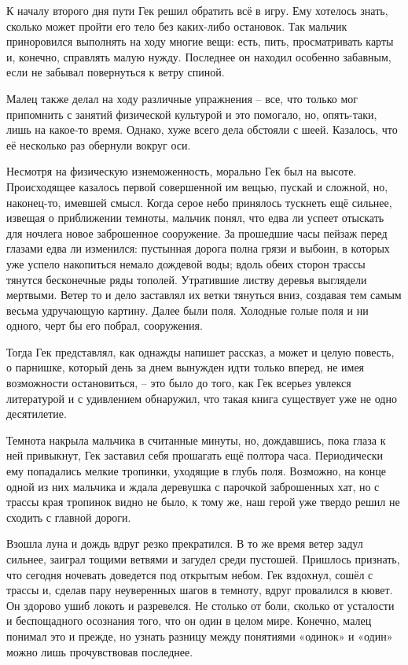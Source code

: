 \documentclass[
  a5paperpaper,
  DIV=11,
  numbers=noendperiod]{scrreprt}
\begin{document}
К началу второго дня пути Гек решил обратить всё в игру. Ему хотелось
знать, сколько может пройти его тело без каких-либо остановок. Так
мальчик приноровился выполнять на ходу многие вещи: есть, пить,
просматривать карты и, конечно, справлять малую нужду. Последнее он
находил особенно забавным, если не забывал повернуться к ветру спиной.

Малец также делал на ходу различные упражнения -- все, что только мог
припомнить с занятий физической культурой и это помогало, но,
опять-таки, лишь на какое-то время. Однако, хуже всего дела обстояли с
шеей. Казалось, что её несколько раз обернули вокруг оси.

Несмотря на физическую изнеможенность, морально Гек был на высоте.
Происходящее казалось первой совершенной им вещью, пускай и сложной, но,
наконец-то, имевшей смысл. Когда серое небо принялось тускнеть ещё
сильнее, извещая о приближении темноты, мальчик понял, что едва ли
успеет отыскать для ночлега новое заброшенное сооружение. За прошедшие
часы пейзаж перед глазами едва ли изменился: пустынная дорога полна
грязи и выбоин, в которых уже успело накопиться немало дождевой воды;
вдоль обеих сторон трассы тянутся бесконечные ряды тополей. Утратившие
листву деревья выглядели мертвыми. Ветер то и дело заставлял их ветки
тянуться вниз, создавая тем самым весьма удручающую картину. Далее были
поля. Холодные голые поля и ни одного, черт бы его побрал, сооружения.

Тогда Гек представлял, как однажды напишет рассказ, а может и целую
повесть, о парнишке, который день за днем вынужден идти только вперед,
не имея возможности остановиться, -- это было до того, как Гек всерьез
увлекся литературой и с удивлением обнаружил, что такая книга существует
уже не одно десятилетие.

Темнота накрыла мальчика в считанные минуты, но, дождавшись, пока глаза
к ней привыкнут, Гек заставил себя прошагать ещё полтора часа.
Периодически ему попадались мелкие тропинки, уходящие в глубь поля.
Возможно, на конце одной из них мальчика и ждала деревушка с парочкой
заброшенных хат, но с трассы края тропинок видно не было, к тому же, наш
герой уже твердо решил не сходить с главной дороги.

Взошла луна и дождь вдруг резко прекратился. В то же время ветер задул
сильнее, заиграл тощими ветвями и загудел среди пустошей. Пришлось
признать, что сегодня ночевать доведется под открытым небом. Гек
вздохнул, сошёл с трассы и, сделав пару неуверенных шагов в темноту,
вдруг провалился в кювет. Он здорово ушиб локоть и разревелся. Не
столько от боли, сколько от усталости и беспощадного осознания того, что
он один в целом мире. Конечно, малец понимал это и прежде, но узнать
разницу между понятиями «одинок» и «один» можно лишь прочувствовав
последнее.
\end{document}
